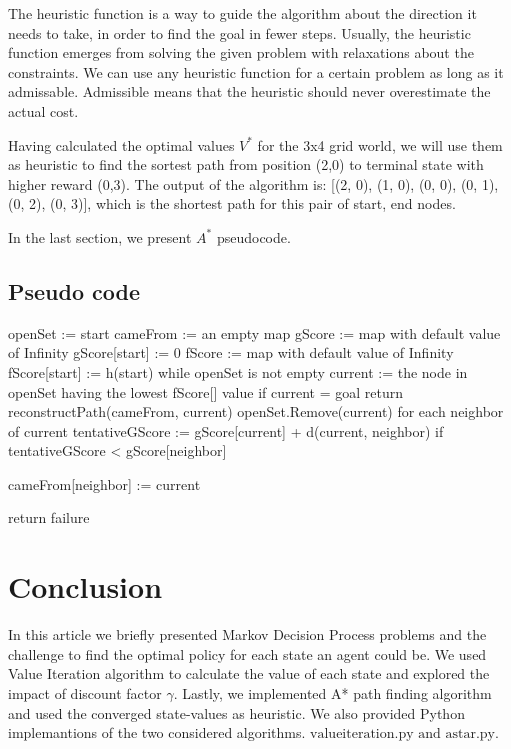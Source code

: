 \documentclass[10pt,a4paper,twocolumn]{article}
\begin{document}
	The heuristic function is a way to guide the algorithm about the direction it needs to take, in order to find the goal in fewer steps. Usually, the heuristic function emerges from solving the given problem with relaxations about the constraints. We can use any heuristic function for a certain problem as long as it admissable. Admissible means that the heuristic should never overestimate the actual cost.
	
	Having calculated the optimal values $V^{*}$ for the 3x4 grid world, we will use them as heuristic to find the sortest path from position (2,0) to terminal state with higher reward (0,3). The output of the algorithm is:
	[(2, 0), (1, 0), (0, 0), (0, 1), (0, 2), (0, 3)], which is the shortest path for this pair of start, end nodes.
	
	In the last section, we present $A^{*}$ pseudocode.
	
	\subsection{Pseudo code}
	openSet := {start}
	\newline
	cameFrom := an empty map
	\newline
	gScore := map with default value of Infinity
	\newline
	gScore[start] := 0
	\newline
	fScore := map with default value of Infinity
	\newline
	fScore[start] := h(start)
	\newline
	 while openSet is not empty
	\newline
	current := the node in openSet having the lowest fScore[] value
		\newline
	if current = goal
		\newline
	return reconstructPath(cameFrom, current)
		\newline
	openSet.Remove(current)
		\newline
	for each neighbor of current
	\newline
	tentativeGScore := gScore[current] + d(current, neighbor)
		\newline
	if tentativeGScore < gScore[neighbor]
		\newline

	cameFrom[neighbor] := current


	return failure
	
	\section{Conclusion}
	In this article we briefly presented Markov Decision Process problems and the challenge to find the optimal policy for each state an agent could be. We used Value Iteration algorithm to calculate the value of each state and explored the impact of discount factor $\gamma$. Lastly, we implemented A* path finding algorithm and used the converged state-values as heuristic.
	We also provided Python implemantions of the two considered algorithms. $\text{valueiteration.py and astar.py}$.
	
\end{document}

